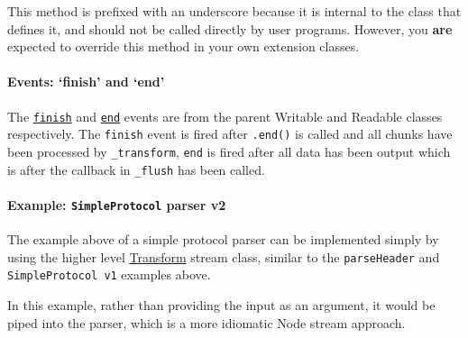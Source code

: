 This method is prefixed with an underscore because it is internal to the
class that defines it, and should not be called directly by user
programs. However, you \textbf{are} expected to override this method in
your own extension classes.

\paragraph{Events: `finish' and `end'}\label{events-finish-and-end}

The \hyperref[streamux5feventux5ffinish]{\texttt{finish}} and
\hyperref[streamux5feventux5fend]{\texttt{end}} events are from the
parent Writable and Readable classes respectively. The \texttt{finish}
event is fired after \texttt{.end()} is called and all chunks have been
processed by \texttt{\_transform}, \texttt{end} is fired after all data
has been output which is after the callback in \texttt{\_flush} has been
called.

\paragraph{Example: \texttt{SimpleProtocol} parser
v2}\label{example-simpleprotocol-parser-v2}

The example above of a simple protocol parser can be implemented simply
by using the higher level
\hyperref[streamux5fclassux5fstreamux5ftransform]{Transform} stream
class, similar to the \texttt{parseHeader} and
\texttt{SimpleProtocol v1} examples above.

In this example, rather than providing the input as an argument, it
would be piped into the parser, which is a more idiomatic Node stream
approach.

